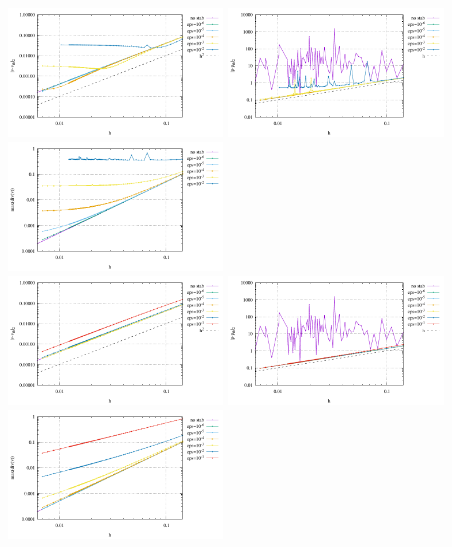 \begin{center}
\includegraphics[width=5.7cm]{python_codes/fieldstone_115/results/buha06/errorsV_penalty.pdf}
\includegraphics[width=5.7cm]{python_codes/fieldstone_115/results/buha06/errorsP_penalty.pdf}
\includegraphics[width=5.7cm]{python_codes/fieldstone_115/results/buha06/divv_penalty.pdf}\\
\includegraphics[width=5.7cm]{python_codes/fieldstone_115/results/buha06/errorsV_global.pdf}
\includegraphics[width=5.7cm]{python_codes/fieldstone_115/results/buha06/errorsP_global.pdf}
\includegraphics[width=5.7cm]{python_codes/fieldstone_115/results/buha06/divv_global.pdf}\\

\end{center}
